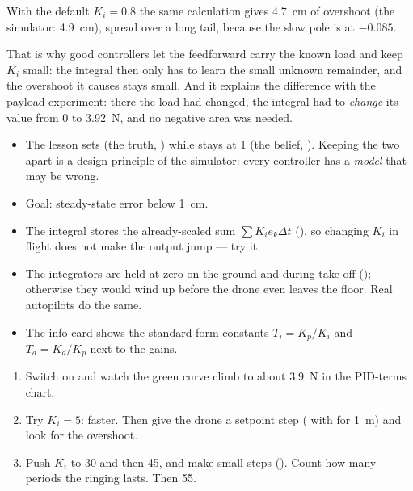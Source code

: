 With the default $K_i = 0.8$ the same calculation gives \SI{4.7}{cm} of overshoot (the simulator: \SI{4.9}{cm}), spread over a long tail, because the slow pole is at $-0.085$.

That is why good controllers let the feedforward carry the known load and keep $K_i$ small: the integral then only has to learn the small unknown remainder, and the overshoot it causes stays small. And it explains the difference with the payload experiment: there the load had changed, the integral had to \emph{change} its value from 0 to \SI{3.92}{N}, and no negative area was needed.

\begin{inapp}
\begin{itemize}[leftmargin=1.2em]
  \item The lesson sets  (the truth, ) while  stays at 1 (the belief, ). Keeping the two apart is a design principle of the simulator: every controller has a \emph{model} that may be wrong.
  \item Goal: steady-state error below \SI{1}{cm}.
  \item The integral stores the already-scaled sum $\sum K_i e_k\Delta t$ (), so changing $K_i$ in flight does not make the output jump — try it.
  \item The integrators are held at zero on the ground and during take-off (); otherwise they would wind up before the drone even leaves the floor. Real autopilots do the same.
  \item The info card shows the standard-form constants $T_i = K_p/K_i$ and $T_d = K_d/K_p$ next to the gains.
\end{itemize}
\end{inapp}

\begin{trythis}
\begin{enumerate}
  \item Switch \It on and watch the green curve climb to about \SI{3.9}{N} in the PID-terms chart.
  \item Try $K_i = 5$: faster. Then give the drone a setpoint step ( with  for \SI{1}{m}) and look for the overshoot.
  \item Push $K_i$ to 30 and then 45, and make small steps (). Count how many periods the ringing lasts. Then 55.
\end{enumerate}
\end{trythis}

